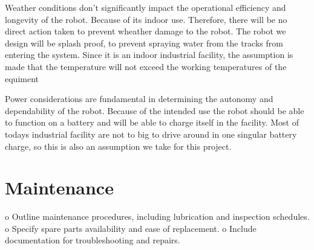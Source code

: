 \documentclass[a4paper]{article}
\begin{document}
Weather conditions don't significantly impact the operational efficiency and longevity of the robot. Because of its indoor use. Therefore, there will be no direct action taken to prevent wheather damage to the robot. The robot we design will be splash proof, to prevent spraying water from the tracks from entering the system. Since it is an indoor industrial facility, the assumption is made that the temperature will not exceed the working temperatures of the equiment

Power considerations are fundamental in determining the autonomy and dependability of the robot. Because of the intended use the robot should be able to function on a battery and will be able to charge itself in the facility. Most of todays industrial facility are not to big to drive around in one singular battery charge, so this is also an assumption we take for this project.

\section*{Maintenance}
o	Outline maintenance procedures, including lubrication and inspection schedules.
o	Specify spare parts availability and ease of replacement.
o	Include documentation for troubleshooting and repairs. 





\end{document}
